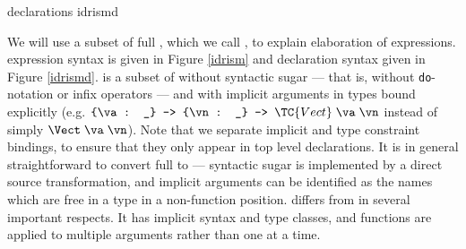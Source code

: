 {\IdrisM{} declarations}
{idrismd}

We will use a subset of full \Idris{}, which we call \IdrisM{}, to explain
elaboration of expressions. \IdrisM{} expression syntax is given in Figure
\ref{idrism} and declaration syntax given in Figure \ref{idrismd}.
\IdrisM{} is a subset of \Idris{} without syntactic sugar --- that is, without
\texttt{do}-notation or infix operators --- and with implicit
arguments in types bound explicitly 
(e.g. $\piimp{\va}{\_}\piimp{\vn}{\_}\TC{Vect}\;\va\;\vn$
instead of simply $\Vect\;\va\;\vn$).
Note that we separate implicit and type constraint bindings, to ensure that they
only appear in top level declarations.
It is in general straightforward to
convert full \Idris{} to \IdrisM{} --- syntactic sugar is implemented by a
direct source transformation, and implicit arguments can be identified as the names
which are free in a type in a non-function position.
%
\IdrisM{} differs from \TT{} in several important respects. It has implicit
syntax and type classes, and functions are applied to multiple arguments rather
than one at a time. 

